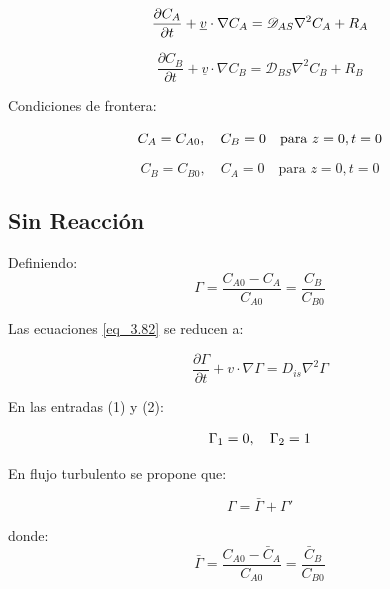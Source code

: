 \begin{equation}
    \frac{\partial C_A}{\partial t} + \underline{v} \cdot \nabla C_A = \mathscr{D}_{AS} \nabla^2 C_A + R_A
    \notag
\end{equation}

\begin{equation}
    \frac{\partial C_B}{\partial t} + \underline{v} \cdot \nabla C_B = \mathscr{D}_{BS} \nabla^2 C_B + R_B
    \label{eq_3.82}
\end{equation}




Condiciones de frontera:

\begin{equation}
    C_A = C_{A0}, \quad C_B = 0 \quad \text{para } z=0, t=0
    \notag
\end{equation}

\begin{equation}
    C_B = C_{B0}, \quad C_A = 0 \quad \text{para } z=0, t=0
\end{equation}

\subsection{Sin Reacción}

Definiendo:
\begin{equation}
    \Gamma = \frac{C_{A0} - C_A}{C_{A0}} = \frac{C_B}{C_{B0}}
\end{equation}

Las ecuaciones \eqref{eq_3.82} se reducen a:

\begin{equation}
    \frac{\partial \Gamma}{\partial t} + v \cdot \nabla \Gamma = D_{is} \nabla^2 \Gamma
\end{equation}

En las entradas (1) y (2):

\begin{equation}
    \Gamma_1 = 0, \quad \Gamma_2 = 1 \notag
\end{equation}

En flujo turbulento se propone que:

\begin{equation}
    \Gamma = \bar{\Gamma} + \Gamma'
\end{equation}

donde:
\begin{equation}
   \bar{\Gamma} = \frac{C_{A0} - \bar{C}_A}{C_{A0}} = \frac{\bar{C}_B}{C_{B0}}
\end{equation}




